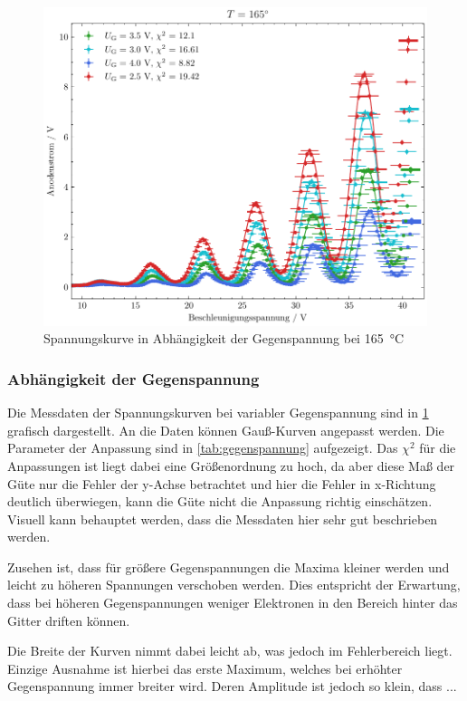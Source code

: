 \begin{figure}[htb]
    \centering
    \includegraphics[width=0.6\linewidth]{../figs/franck-hertz_gegenspannung}
    \caption{Spannungskurve in Abhängigkeit der Gegenspannung bei \SI{165}{\celsius}}
    \label{fig:gegenspannung}
\end{figure}

\subsubsection{Abhängigkeit der Gegenspannung}\label{sec:franck-hertz-gegen}
Die Messdaten der Spannungskurven bei variabler Gegenspannung sind in 
\cref{fig:gegenspannung} grafisch dargestellt. An die Daten können Gauß-Kurven
angepasst werden. Die Parameter der Anpassung sind in \cref{tab:gegenspannung}
aufgezeigt. Das $\chi^2$ für die Anpassungen ist liegt dabei eine Größenordnung zu
hoch, da aber diese Maß der Güte nur die Fehler der y-Achse betrachtet und 
hier die Fehler in x-Richtung deutlich überwiegen, kann die Güte 
nicht die Anpassung richtig einschätzen. Visuell kann behauptet werden,
dass die Messdaten hier sehr gut beschrieben werden.

Zusehen ist, dass für größere Gegenspannungen 
die Maxima kleiner werden und leicht zu höheren Spannungen verschoben werden. 
Dies entspricht der Erwartung, dass bei höheren Gegenspannungen weniger 
Elektronen in den Bereich hinter das Gitter driften können.

Die Breite der Kurven nimmt dabei leicht ab, was jedoch im Fehlerbereich liegt. 
Einzige Ausnahme ist hierbei das erste Maximum, welches bei erhöhter 
Gegenspannung immer breiter wird. Deren Amplitude ist jedoch so klein, dass ...


